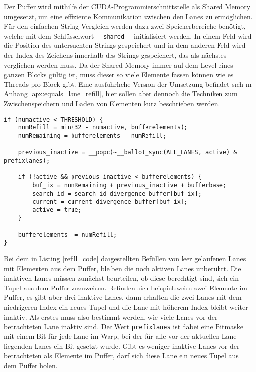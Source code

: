 Der Puffer wird mithilfe der CUDA-Programmierschnittstelle als Shared Memory umgesetzt, um eine effiziente Kommunikation zwischen den Lanes zu ermöglichen.
Für den einfachen String-Vergleich werden dazu zwei Speicherbereiche benötigt, welche mit dem Schlüsselwort \texttt{\_\_shared\_\_} initialisiert werden.
In einem Feld wird die Position des untersuchten Strings gespeichert und in dem anderen Feld wird der Index des Zeichens innerhalb des Strings gespeichert, das als nächstes verglichen werden muss.
Da der Shared Memory immer auf dem Level eines ganzen Blocks gültig ist, muss dieser so viele Elemente fassen können wie es Threads pro Block gibt.
Eine ausführliche Version der Umsetzung befindet sich in Anhang \ref{apx:equals_lane_refill}, hier sollen aber dennoch die Techniken zum Zwischenspeichern und Laden von Elementen kurz beschrieben werden.

\begin{lstlisting}[language=MyC++,
caption=Befüllen inaktiver Lanes mit Elementen aus dem Puffer,
label=refill_code]
if (numactive < THRESHOLD) {
	numRefill = min(32 - numactive, bufferelements);
	numRemaining = bufferelements - numRefill;
	
	previous_inactive = __popc(~__ballot_sync(ALL_LANES, active) & prefixlanes);
	
	if (!active && previous_inactive < bufferelements) {
		buf_ix = numRemaining + previous_inactive + bufferbase;
		search_id = search_id_divergence_buffer[buf_ix];
		current = current_divergence_buffer[buf_ix];
		active = true;
	}
	
	bufferelements -= numRefill;
}
\end{lstlisting}

Bei dem in Listing \ref{refill_code} dargestellten Befüllen von leer gelaufenen Lanes mit Elementen aus dem Puffer, bleiben die noch aktiven Lanes unberührt.
Die inaktiven Lanes müssen zunächst beurteilen, ob diese berechtigt sind, sich ein Tupel aus dem Puffer zuzuweisen.
Befinden sich beispielsweise zwei Elemente im Puffer, es gibt aber drei inaktive Lanes, dann erhalten die zwei Lanes mit dem niedrigeren Index ein neues Tupel und die Lane mit höherem Index bleibt weiter inaktiv.
Als erstes muss also bestimmt werden, wie viele Lanes vor der betrachteten Lane inaktiv sind.
Der Wert \texttt{prefixlanes} ist dabei eine Bitmaske mit einem Bit für jede Lane im Warp, bei der für alle vor der aktuellen Lane liegenden Lanes ein Bit gesetzt wurde.
Gibt es weniger inaktive Lanes vor der betrachteten als Elemente im Puffer, darf sich diese Lane ein neues Tupel aus dem Puffer holen.

